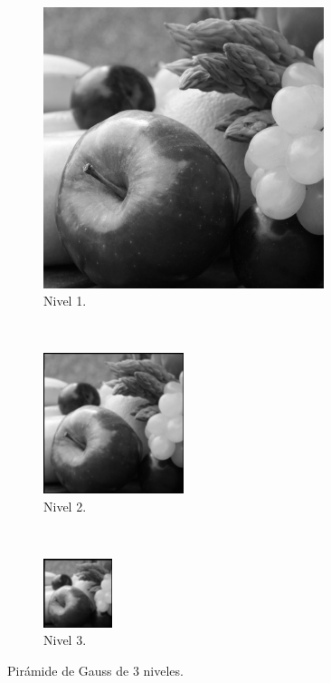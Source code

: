 \documentclass[12pt, letterpaper]{article}
\begin{document}
\begin{figure}[H]
  \centering
  \begin{subfigure}[t]{0.32\textwidth}
    \centering
    \includegraphics[width = 0.9\textwidth]{piramides/gp1.png}
    \caption{Nivel 1.}
  \end{subfigure}
  ~
  \begin{subfigure}[t]{0.32\textwidth}
      \centering
      \includegraphics[width = 0.45\textwidth]{piramides/gp2.png}
      \caption{Nivel 2.}
  \end{subfigure}
  ~ 
  \begin{subfigure}[t]{0.32\textwidth}
      \centering
      \includegraphics[width = 0.22\textwidth]{piramides/gp3.png}
      \caption{Nivel 3.}
  \end{subfigure}
  \caption{Pirámide de Gauss de 3 niveles.}
  \label{fig:gp3frutas}
\end{figure}
\end{document}
